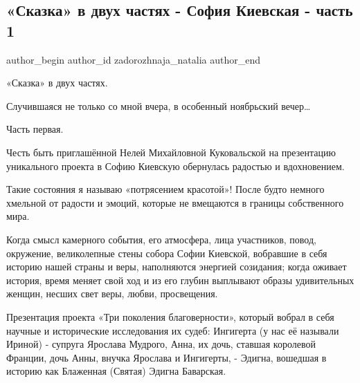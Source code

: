  
 
 
 
 
 
\subsection{«Сказка» в двух частях - София Киевская - часть 1}
\label{sec:19_11_2021.fb.zadorozhnaja_natalia.1.skazka_sofia_1}
 
\ifcmt
 author_begin
   author_id zadorozhnaja_natalia
 author_end
\fi

«Сказка» в двух частях. 

Случившаяся не только со мной вчера, в особенный ноябрьский вечер…

Часть первая.

Честь быть приглашённой Нелей Михайловной Куковальской на презентацию
уникального проекта  в Софию Киевскую обернулась радостью и вдохновением. 


Такие состояния я называю «потрясением красотой»! После будто немного хмельной
от радости и эмоций, которые не вмещаются в границы собственного мира.

Когда смысл камерного события, его атмосфера, лица участников, повод,
окружение, великолепные стены собора Софии Киевской, вобравшие в себя историю
нашей страны и веры, наполняются энергией созидания; когда оживает история,
время меняет свой ход и из его глубин выплывают образы удивительных женщин,
несших свет веры, любви, просвещения. 


Презентация проекта «Три поколения благоверности», который вобрал в себя
научные и исторические исследования их судеб: Ингигерта (у нас её называли
Ириной) - супруга Ярослава Мудрого,
Анна, их дочь, ставшая королевой Франции, дочь Анны, внучка Ярослава и
Ингигерты, - Эдигна, вошедшая в историю как Блаженная (Святая) Эдигна
Баварская.

